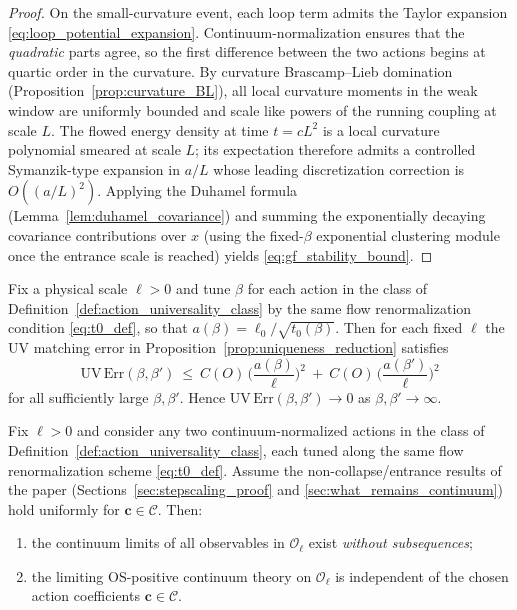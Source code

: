 \begin{proof}
On the small-curvature event, each loop term admits the Taylor expansion \eqref{eq:loop_potential_expansion}.
Continuum-normalization ensures that the \emph{quadratic} parts agree, so the first difference between the two actions begins at quartic order in
the curvature.
By curvature Brascamp--Lieb domination (Proposition~\ref{prop:curvature_BL}), all local curvature moments in the weak window are uniformly bounded
and scale like powers of the running coupling at scale $L$.
The flowed energy density at time $t=cL^2$ is a local curvature polynomial smeared at scale $L$; its expectation therefore admits a controlled
Symanzik-type expansion in $a/L$ whose leading discretization correction is $O((a/L)^2)$.
Applying the Duhamel formula (Lemma~\ref{lem:duhamel_covariance}) and summing the exponentially decaying covariance contributions over $x$
(using the fixed-$\beta$ exponential clustering module once the entrance scale is reached) yields \eqref{eq:gf_stability_bound}.
\end{proof}

\begin{corollary}\label{cor:UV_matching_error}
Fix a physical scale $\ell>0$ and tune $\beta$ for each action in the class of Definition~\ref{def:action_universality_class} by the same flow
renormalization condition \eqref{eq:t0_def}, so that $a(\beta)=\ell_0/\sqrt{t_0(\beta)}$.
Then for each fixed $\ell$ the UV matching error in Proposition~\ref{prop:uniqueness_reduction} satisfies
\[
\mathrm{UV\,Err}(\beta,\beta')\ \le\ C(O)\,\Big(\frac{a(\beta)}{\ell}\Big)^{2}\ +\ C(O)\,\Big(\frac{a(\beta')}{\ell}\Big)^{2}
\]
for all sufficiently large $\beta,\beta'$.
Hence $\mathrm{UV\,Err}(\beta,\beta')\to 0$ as $\beta,\beta'\to\infty$.
\end{corollary}

\begin{theorem}\label{thm:universality_on_Oell}
Fix $\ell>0$ and consider any two continuum-normalized actions in the class of Definition~\ref{def:action_universality_class},
each tuned along the same flow renormalization scheme \eqref{eq:t0_def}.
Assume the non-collapse/entrance results of the paper (Sections~\ref{sec:stepscaling_proof} and \ref{sec:what_remains_continuum})
hold uniformly for $\mathbf c\in\mathcal C$.
Then:
\begin{enumerate}[leftmargin=*]
\item the continuum limits of all observables in $\mathcal O_{\ell}$ exist \emph{without subsequences};
\item the limiting OS-positive continuum theory on $\mathcal O_{\ell}$ is independent of the chosen action coefficients $\mathbf c\in\mathcal C$.
\end{enumerate}
\end{theorem}

